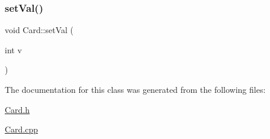 \mbox{\label{class_card_a803b8640efc785d0b704740bbefd7407}} 
\subsubsection{\texorpdfstring{set\+Val()}{setVal()}}
{\footnotesize\ttfamily void Card\+::set\+Val (\begin{DoxyParamCaption}\item[{int}]{v }\end{DoxyParamCaption})}



The documentation for this class was generated from the following files\+:\begin{DoxyCompactItemize}
\item 
\mbox{\hyperlink{_card_8h}{Card.\+h}}\item 
\mbox{\hyperlink{_card_8cpp}{Card.\+cpp}}\end{DoxyCompactItemize}

